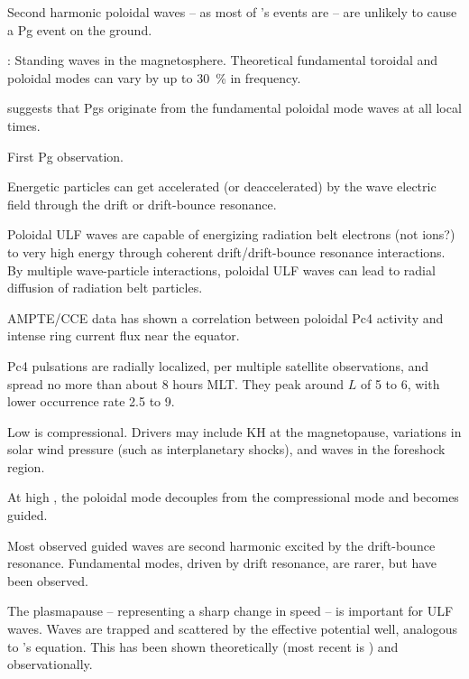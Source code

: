 Second harmonic poloidal waves -- as most of \cite{dai_2015}'s events are -- are unlikely to cause a Pg event on the ground\cite{takahashi_1992}. 

\cite{cummings_1969}: Standing \Alfven waves in the magnetosphere. Theoretical fundamental toroidal and poloidal modes can vary by up to \SI{30}{\percent} in frequency. 

\cite{motoba_2015} suggests that Pgs originate from the fundamental poloidal mode waves at all local times. 

First Pg observation\cite{birkeland_1901}. 

Energetic particles can get accelerated (or deaccelerated) by the wave electric field through the drift or drift-bounce resonance\cite{elkington_1999}. 

Poloidal ULF waves are capable of energizing radiation belt electrons (not ions?)  to very high energy through coherent drift/drift-bounce resonance interactions\cite{elkington_1999,ozeke_2008,mann_2013}. By multiple wave-particle interactions, poloidal ULF waves can lead to radial diffusion of radiation belt particles\cite{elkington_2003,tu_2012,ozeke_2012}. 

AMPTE/CCE data has shown a correlation between poloidal Pc4 activity and intense ring current flux near the equator\cite{engebretson_1988}. 

Pc4 pulsations are radially localized, per multiple satellite observations\cite{engebretson_1992}, and spread no more than about 8 hours MLT. They peak around $L$ of 5 to 6, with lower occurrence rate 2.5 to 9\cite{anderson_1990,liu_2009}.

Low \azm is compressional\cite{hughes_1994}. Drivers may include KH at the magnetopause\cite{chen_1974,southwood_1974,liu_2011}, variations in solar wind pressure (such as interplanetary shocks)\cite{zong_2007,zong_2009,hao_2014,degeling_2014,kessel_2008}, and waves in the foreshock region\cite{russell_1983,takahashi_2015}. 

At high \azm, the poloidal mode decouples from the compressional mode\cite{hughes_1994} and becomes guided\cite{cummings_1969}. 

Most observed guided waves are second harmonic excited by the drift-bounce resonance\cite{hughes_1978,singer_1982,takahashi_1990}. Fundamental modes, driven by drift resonance, are rarer, but have been observed\cite{dai_2013}. 

The plasmapause -- representing a sharp change in \Alfven speed -- is important for ULF waves. Waves are trapped and scattered by the effective potential well, analogous to \Schrodinger's equation\cite{lee_1998,lee_1999,dai_2009}. This has been shown theoretically\cite{klimushkin_1998,leonovich_2000,klimushkin_2004,mager_2013} (most recent is \cite{mager_2013}) and observationally\cite{takahashi_2009,takahashi_2010}. 

